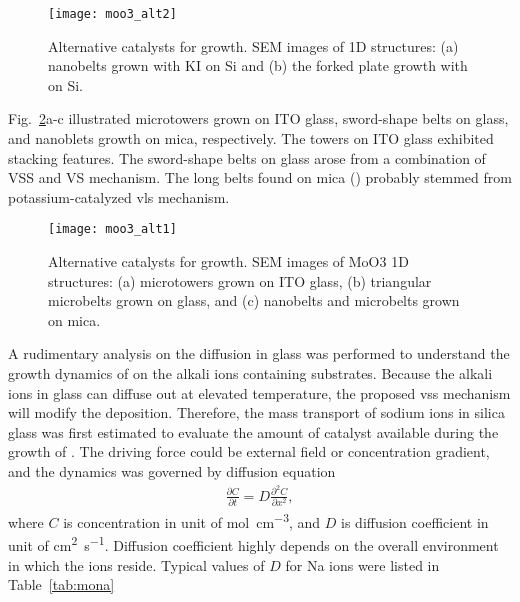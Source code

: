 \begin{figure}[htb]
\centering
\texttt{[image: moo3\_alt2]}
\caption[Alternative catalysts for  growth]{Alternative catalysts for  growth. SEM images of  1D structures: (a) nanobelts grown with KI on Si and (b) the forked plate growth with  on Si.}
\label{fig:ch4al1}
\end{figure}

Fig.~\ref{fig:ch4al2}a-c illustrated microtowers grown on ITO glass, sword-shape belts on glass, and nanoblets growth on mica, respectively. The towers on ITO glass exhibited stacking features. The sword-shape belts on glass arose from a combination of VSS and VS mechanism. The long belts found on mica () probably stemmed from potassium-catalyzed \gls{vls} mechanism.\cite{Hu2011}

\begin{figure}[htb]
\centering
\texttt{[image: moo3\_alt1]}
\caption[Alternative catalysts for  growth cont]{Alternative catalysts for  growth. SEM images of MoO3 1D structures: (a) microtowers grown on ITO glass, (b) triangular microbelts grown on glass, and (c) nanobelts and microbelts grown on mica.}
\label{fig:ch4al2}
\end{figure}
A rudimentary analysis on the  diffusion in glass was performed to understand the growth dynamics of  on the alkali ions containing substrates. Because the alkali ions in glass can diffuse out at elevated temperature, the proposed \gls{vss} mechanism will modify the  deposition. Therefore, the mass transport of sodium ions in silica glass was first estimated to evaluate the amount of catalyst available during the growth of . The driving force could be external field or concentration gradient, and the dynamics was governed by diffusion equation
\begin{align}\label{eq:nadiff}
\frac{\partial C}{\partial t} = D \frac{\partial^2 C}{\partial x^2},
\end{align}
where $C$ is concentration in unit of \si{mol\per cm^3}, and $D$ is diffusion coefficient in unit of \si{cm^2\per\second}. Diffusion coefficient highly depends on the overall environment in which the ions reside. Typical values of $D$ for Na ions were listed in Table~\ref{tab:mona}

